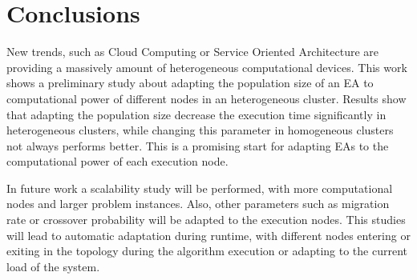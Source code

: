 \documentclass{sig-alternate}
\begin{document}


%



\section{Conclusions}
New trends, such as Cloud Computing or Service Oriented Architecture are providing a massively amount of heterogeneous computational devices. This work shows a preliminary study about adapting the population size of an EA to computational power of different nodes in an heterogeneous cluster. Results show that adapting the population size decrease the execution time significantly in heterogeneous clusters, while changing this parameter in homogeneous clusters not always performs better. This is a promising start for adapting EAs to the computational power of each execution node.

In future work a scalability study will be performed, with more computational nodes and larger problem instances. Also, other parameters such as migration rate or crossover probability will be adapted to the execution nodes. This studies will lead to automatic adaptation during runtime, with different nodes entering or exiting in the topology during the algorithm execution or adapting to the current load of the system.
\end{document}
